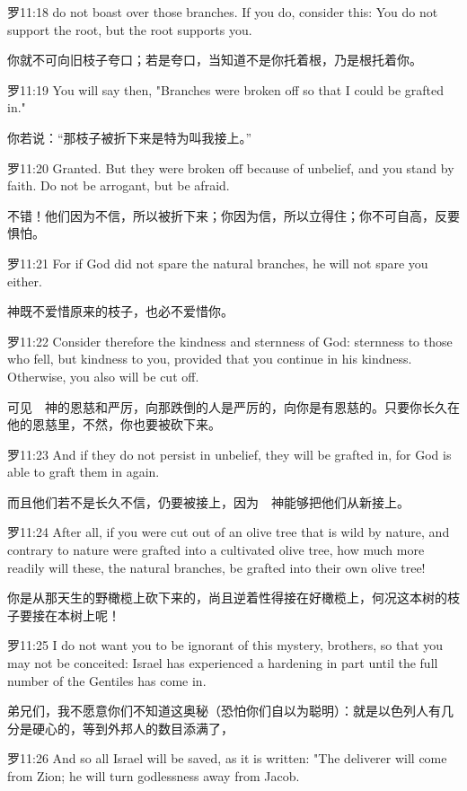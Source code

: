 \documentclass[a4paper,11pt,onecolumn,twoside]{ctexart}
\begin{document}
\begin{multicols}{2}
 罗11:18
 do not boast over those branches. If you do, consider this: You do not support the root, but the root supports you.

 你就不可向旧枝子夸口；若是夸口，当知道不是你托着根，乃是根托着你。


 罗11:19
 You will say then, "Branches were broken off so that I could be grafted in."

 你若说：“那枝子被折下来是特为叫我接上。”


 罗11:20
 Granted. But they were broken off because of unbelief, and you stand by faith. Do not be arrogant, but be afraid.

 不错！他们因为不信，所以被折下来；你因为信，所以立得住；你不可自高，反要惧怕。


 罗11:21
 For if God did not spare the natural branches, he will not spare you either.

 神既不爱惜原来的枝子，也必不爱惜你。


 罗11:22
 Consider therefore the kindness and sternness of God: sternness to those who fell, but kindness to you, provided that you continue in his kindness. Otherwise, you also will be cut off.

 可见　神的恩慈和严厉，向那跌倒的人是严厉的，向你是有恩慈的。只要你长久在他的恩慈里，不然，你也要被砍下来。


 罗11:23
 And if they do not persist in unbelief, they will be grafted in, for God is able to graft them in again.

 而且他们若不是长久不信，仍要被接上，因为　神能够把他们从新接上。


 罗11:24
 After all, if you were cut out of an olive tree that is wild by nature, and contrary to nature were grafted into a cultivated olive tree, how much more readily will these, the natural branches, be grafted into their own olive tree!

 你是从那天生的野橄榄上砍下来的，尚且逆着性得接在好橄榄上，何况这本树的枝子要接在本树上呢！


 罗11:25
 I do not want you to be ignorant of this mystery, brothers, so that you may not be conceited: Israel has experienced a hardening in part until the full number of the Gentiles has come in.

 弟兄们，我不愿意你们不知道这奥秘（恐怕你们自以为聪明）：就是以色列人有几分是硬心的，等到外邦人的数目添满了，


 罗11:26
 And so all Israel will be saved, as it is written: "The deliverer will come from Zion; he will turn godlessness away from Jacob.


\end{multicols}
\end{document}
